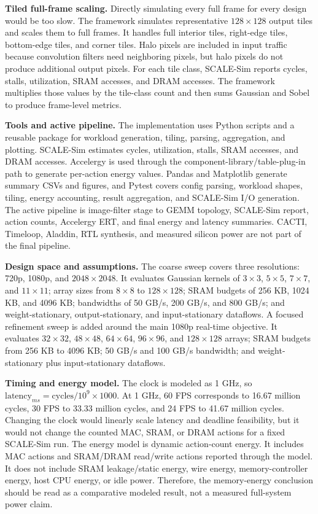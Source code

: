 \documentclass[12pt]{article}
\begin{document}
\textbf{Tiled full-frame scaling.} Directly simulating every full frame for every design would be too slow. The framework simulates representative $128\times128$ output tiles and scales them to full frames. It handles full interior tiles, right-edge tiles, bottom-edge tiles, and corner tiles. Halo pixels are included in input traffic because convolution filters need neighboring pixels, but halo pixels do not produce additional output pixels. For each tile class, SCALE-Sim reports cycles, stalls, utilization, SRAM accesses, and DRAM accesses. The framework multiplies those values by the tile-class count and then sums Gaussian and Sobel to produce frame-level metrics.

\textbf{Tools and active pipeline.} The implementation uses Python scripts and a reusable  package for workload generation, tiling, parsing, aggregation, and plotting. SCALE-Sim estimates cycles, utilization, stalls, SRAM accesses, and DRAM accesses. Accelergy is used through the component-library/table-plug-in path to generate per-action energy values. Pandas and Matplotlib generate summary CSVs and figures, and Pytest covers config parsing, workload shapes, tiling, energy accounting, result aggregation, and SCALE-Sim I/O generation. The active pipeline is image-filter stage to GEMM topology, SCALE-Sim report, action counts, Accelergy ERT, and final energy and latency summaries. CACTI, Timeloop, Aladdin, RTL synthesis, and measured silicon power are not part of the final pipeline.

\textbf{Design space and assumptions.} The coarse sweep covers three resolutions: 720p, 1080p, and $2048\times2048$. It evaluates Gaussian kernels of $3\times3$, $5\times5$, $7\times7$, and $11\times11$; array sizes from $8\times8$ to $128\times128$; SRAM budgets of 256 KB, 1024 KB, and 4096 KB; bandwidths of 50 GB/s, 200 GB/s, and 800 GB/s; and weight-stationary, output-stationary, and input-stationary dataflows. A focused refinement sweep is added around the main 1080p real-time objective. It evaluates $32\times32$, $48\times48$, $64\times64$, $96\times96$, and $128\times128$ arrays; SRAM budgets from 256 KB to 4096 KB; 50 GB/s and 100 GB/s bandwidth; and weight-stationary plus input-stationary dataflows.

\textbf{Timing and energy model.} The clock is modeled as 1 GHz, so $\text{latency}_{ms}=\text{cycles}/10^9 \times 1000$. At 1 GHz, 60 FPS corresponds to 16.67 million cycles, 30 FPS to 33.33 million cycles, and 24 FPS to 41.67 million cycles. Changing the clock would linearly scale latency and deadline feasibility, but it would not change the counted MAC, SRAM, or DRAM actions for a fixed SCALE-Sim run. The energy model is dynamic action-count energy. It includes MAC actions and SRAM/DRAM read/write actions reported through the model. It does not include SRAM leakage/static energy, wire energy, memory-controller energy, host CPU energy, or idle power. Therefore, the memory-energy conclusion should be read as a comparative modeled result, not a measured full-system power claim.
\end{document}
